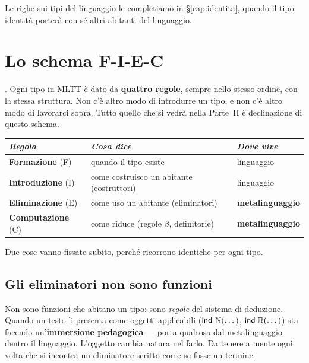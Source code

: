 \noindent Le righe sui tipi del linguaggio le completiamo in \S\ref{cap:identita}, quando il tipo identit\`a porter\`a con s\'e altri abitanti del linguaggio.

\chapter{Lo schema F-I-E-C}\label{cap:fiec}

. Ogni tipo in MLTT \`e dato da \textbf{quattro regole}, sempre nello stesso ordine, con la stessa struttura. Non c'\`e altro modo di introdurre un tipo, e non c'\`e altro modo di lavorarci sopra. Tutto quello che si vedr\`a nella Parte~II \`e declinazione di questo schema.

\bigskip

\begin{center}
\renewcommand{\arraystretch}{1.25}
\begin{tabular}{lll}
\toprule
\textit{Regola} & \textit{Cosa dice} & \textit{Dove vive} \\
\midrule
\textbf{Formazione} (F) & quando il tipo esiste & linguaggio \\
\textbf{Introduzione} (I) & come costruisco un abitante (costruttori) & linguaggio \\
\textbf{Eliminazione} (E) & come uso un abitante (eliminatori) & \textbf{metalinguaggio} \\
\textbf{Computazione} (C) & come riduce (regole $\beta$, definitorie) & \textbf{metalinguaggio} \\
\bottomrule
\end{tabular}
\end{center}

\bigskip

Due cose vanno fissate subito, perch\'e ricorrono identiche per ogni tipo.

\section*{Gli eliminatori non sono funzioni}

Non sono funzioni che abitano un tipo: sono \emph{regole} del sistema di deduzione. Quando un testo li presenta come oggetti applicabili ($\mathsf{ind\text{-}\mathbb{N}}(\dots)$, $\mathsf{ind\text{-}\mathbb{B}}(\dots)$) sta facendo un'\textbf{immersione pedagogica} --- porta qualcosa dal metalinguaggio dentro il linguaggio. L'oggetto cambia natura nel farlo. Da tenere a mente ogni volta che si incontra un eliminatore scritto come se fosse un termine.

